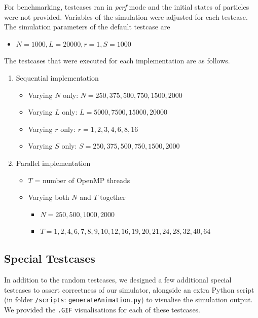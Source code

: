 \documentclass[12pt]{article}
\begin{document}
For benchmarking, testcases ran in \textit{perf} mode and the initial states of particles were not provided. Variables of the simulation were adjusted for each testcase. \\

The simulation parameters of the default testcase are
\begin{itemize}
	\item $N = 1000, L=20000, r=1, S=1000$
\end{itemize}

The testcases that were executed for each implementation are as follows. 
\begin{enumerate}
	\item Sequential implementation
	\begin{itemize}
		\item Varying $N$ only: $N = 250, 375, 500, 750, 1500, 2000$
		\item Varying $L$ only: $L = 5000, 7500, 15000, 20000$
		\item Varying $r$ only: $r = 1, 2, 3, 4, 6, 8, 16$
		\item Varying $S$ only: $S = 250, 375, 500, 750, 1500, 2000$
	\end{itemize}
	
	\item Parallel implementation
	\begin{itemize}
		\item $T$ = number of OpenMP threads
		\item Varying both $N$ and $T$ together
		\begin{itemize}
			\item $N = 250, 500, 1000, 2000$
			\item $T = 1, 2, 4, 6, 7, 8, 9, 10, 12, 16, 19, 20, 21, 24, 28, 32, 40, 64$
		\end{itemize}
	\end{itemize}
\end{enumerate}

\pagebreak

\subsection{Special Testcases}


In addition to the random testcases, we designed a few additional special testcases to assert correctness of our simulator, alongside an extra Python script (in folder \texttt{/scripts}: \texttt{generateAnimation.py}) to visualise the simulation output. We provided the \texttt{.GIF} visualisations for each of these testcases. \\
\end{document}
